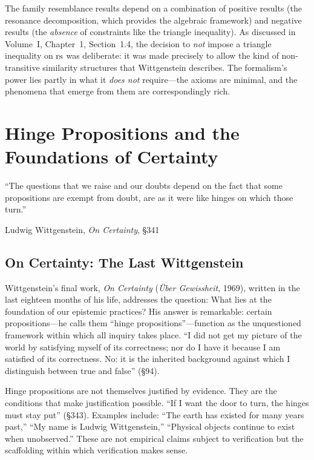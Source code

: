 \begin{remark}
The family resemblance results depend on a combination of positive results
(the resonance decomposition, which provides the algebraic framework) and
negative results (the \emph{absence} of constraints like the triangle
inequality). As discussed in Volume~I, Chapter~1, Section~1.4, the decision
to \emph{not} impose a triangle inequality on $\mathrm{rs}$ was deliberate: it was
made precisely to allow the kind of non-transitive similarity structures
that Wittgenstein describes. The formalism's power lies partly in what it
\emph{does not} require---the axioms are minimal, and the phenomena that
emerge from them are correspondingly rich.
\end{remark}



\chapter{Hinge Propositions and the Foundations of Certainty}
\label{ch:hinge-propositions}

\epigraph{``The questions that we raise and our doubts depend on the fact
that some propositions are exempt from doubt, are as it were like hinges on
which those turn.''}{Ludwig Wittgenstein, \textit{On Certainty}, \S341}

\section{On Certainty: The Last Wittgenstein}

Wittgenstein's final work, \textit{On Certainty} (\textit{\"Uber Gewissheit},
1969), written in the last eighteen months of his life, addresses the question:
What lies at the foundation of our epistemic practices? His answer is
remarkable: certain propositions---he calls them ``hinge propositions''---function
as the unquestioned framework within which all inquiry takes place. ``I did not
get my picture of the world by satisfying myself of its correctness; nor do I
have it because I am satisfied of its correctness. No: it is the inherited
background against which I distinguish between true and false'' (\S94).

Hinge propositions are not themselves justified by evidence. They are the
conditions that make justification possible. ``If I want the door to turn, the
hinges must stay put'' (\S343). Examples include: ``The earth has existed for
many years past,'' ``My name is Ludwig Wittgenstein,'' ``Physical objects
continue to exist when unobserved.'' These are not empirical claims subject to
verification but the scaffolding within which verification makes sense.


